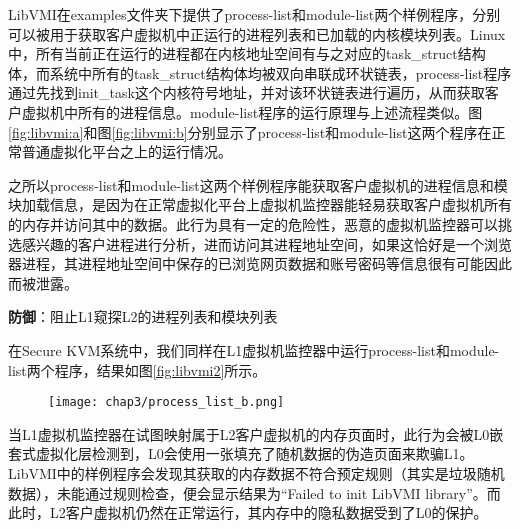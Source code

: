 LibVMI在examples文件夹下提供了process-list和module-list两个样例程序，分别可以被用于获取客户虚拟机中正运行的进程列表和已加载的内核模块列表。Linux中，所有当前正在运行的进程都在内核地址空间有与之对应的task\_struct结构体，而系统中所有的task\_struct结构体均被双向串联成环状链表，process-list程序通过先找到init\_task这个内核符号地址，并对该环状链表进行遍历，从而获取客户虚拟机中所有的进程信息。module-list程序的运行原理与上述流程类似。图\ref{fig:libvmi:a}和图\ref{fig:libvmi:b}分别显示了process-list和module-list这两个程序在正常普通虚拟化平台之上的运行情况。

\begin{figure}
\centering
{}
\end{figure}

之所以process-list和module-list这两个样例程序能获取客户虚拟机的进程信息和模块加载信息，是因为在正常虚拟化平台上虚拟机监控器能轻易获取客户虚拟机所有的内存并访问其中的数据。此行为具有一定的危险性，恶意的虚拟机监控器可以挑选感兴趣的客户进程进行分析，进而访问其进程地址空间，如果这恰好是一个浏览器进程，其进程地址空间中保存的已浏览网页数据和账号密码等信息很有可能因此而被泄露。

\noindent
\textbf{防御\uppercase\expandafter{}}：阻止L1窥探L2的进程列表和模块列表

在Secure KVM系统中，我们同样在L1虚拟机监控器中运行process-list和module-list两个程序，结果如图\ref{fig:libvmi2}所示。

\begin{figure}[!htbp]
  \centering
  \texttt{[image: chap3/process\_list\_b.png]}
\end{figure}

当L1虚拟机监控器在试图映射属于L2客户虚拟机的内存页面时，此行为会被L0嵌套式虚拟化层检测到，L0会使用一张填充了随机数据的伪造页面来欺骗L1。LibVMI中的样例程序会发现其获取的内存数据不符合预定规则（其实是垃圾随机数据），未能通过规则检查，便会显示结果为``Failed to init LibVMI library''。而此时，L2客户虚拟机仍然在正常运行，其内存中的隐私数据受到了L0的保护。

